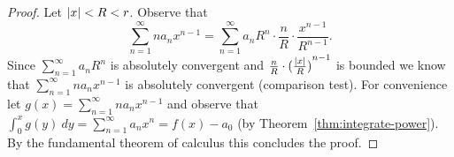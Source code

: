 \begin{proof}
  Let \(\left|x\right|<R<r\).
  Observe that
  \[
    \sum_{n=1}^{\infty} n a_n x^{n-1}    = \sum_{n=1}^{\infty} a_n R^{n} \cdot \frac{n}{R} \cdot \frac{{x}^{n-1}}{R^{n-1}}.
  \]
  Since \(\sum_{n=1}^{\infty} a_n R^n\) is absolutely convergent and \(  \frac{n}{R}  \cdot {( \frac{\left|x\right|}{R} )}^{n-1}\) is bounded we know that
  \(\sum_{n=1}^{\infty} n a_n x^{n-1} \) is absolutely convergent
  (comparison test).
  For convenience let \(g(x) =\sum_{n=1}^{\infty} n a_n x^{n-1} \) and observe that
  \(\int_0^x g(y) \ dy = \sum_{n=1}^{\infty} a_n x^{n} = f(x) - a_0\) (by Theorem~\ref{thm:integrate-power}).
  By the fundamental theorem of calculus this concludes the proof.
\end{proof}







